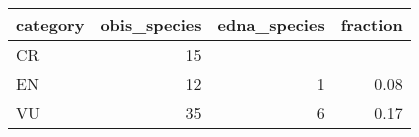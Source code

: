 \begin{longtable}{lrrr}
  \hline
category & obis\_species & edna\_species & fraction \\ 
  \hline
CR &  15 &  &  \\ 
  EN &  12 &   1 & 0.08 \\ 
  VU &  35 &   6 & 0.17 \\ 
   \hline
\hline
\end{longtable}
